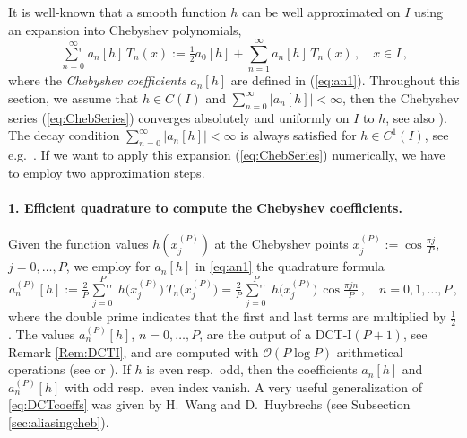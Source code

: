 \documentclass[11pt,a4paper]{scrartcl}
\newcommand{\sumprime}{\mathop{{\sum}'}\limits}
\newcommand{\sumdprime}{\mathop{{\sum}''}\limits}
\numberwithin{equation}{section}
\numberwithin{table}{section}
\numberwithin{figure}{section}
\begin{document}
It is well-known that a smooth function $h$ can be well approximated on $I$ using an expansion into
Chebyshev polynomials,
\begin{equation}
	\label{eq:ChebSeries} 
\textstyle  \sumprime_{n=0}^{\infty} a_n[h]\,T_n(x) := \tfrac12 a_0[h] + \sum\limits_{n=1}^{\infty} a_n[h]\,T_n(x)\,,\quad x \in I\,,
\end{equation}
where the \emph{Chebyshev coefficients} $a_n[h]$ are defined in (\ref{eq:an1}).
Throughout this section,
we assume that $h \in C(I)$ and $\sum_{n=0}^{\infty} |a_n[h]| < \infty$, then the Chebyshev series (\ref{eq:ChebSeries})
converges absolutely and uniformly on $I$ to $h$,
see also \cite[Chapter~6]{PlPoStTa23}).
The decay condition  $\sum_{n=0}^{\infty} |a_n[h]| < \infty$ is always satisfied for $h \in C^1(I)$, see e.g.\ \cite[Theorem~6.11]{PlPoStTa23}.
If we want to apply this expansion (\ref{eq:ChebSeries}) numerically, we have to employ two approximation steps.

\paragraph{1. Efficient quadrature to compute the Chebyshev coefficients.}
Given the function values $h(x_j^{(P)})$ at the Chebyshev points
$x_j^{(P)} := \cos\tfrac{\pi j}{P}$, $j = 0,\ldots,P$, we employ for $a_n[h]$ in \eqref{eq:an1}
the quadrature formula
\begin{equation}
	\label{eq:DCTcoeffs}
	\textstyle a_n^{(P)}[h] := \tfrac{2}{P} \sumdprime_{\!\!\!j=0}^{\!\!\!P}
	\, h\big(x_j^{(P)}\big)\,T_n\big(x_j^{(P)}\big) = \tfrac{2}{P} \sumdprime_{\!\!\!j=0}^{\!\!\!P}
	\, h\big(x_j^{(P)}\big)\,\cos \tfrac{\pi j n}{P}\,,\quad n=0,1,\ldots,P\,,
\end{equation}
where the double prime indicates that the first and last terms are multiplied by $\tfrac12$. The
values $a_n^{(P)}[h]$, $n=0,\ldots,P$, are the output of a DCT-I$(P+1)$, see Remark
\ref{Rem:DCTI}, and are computed with ${\mathcal O}(P\log P)$ arithmetical operations (see
\cite{PlTa05} or \cite[Section~6.3]{PlPoStTa23}). If $h$ is even resp.\ odd, then the
coefficients  $a_n[h]$ and $a_n^{(P)}[h]$ with odd resp.\ even index  vanish.
A very useful generalization of \eqref{eq:DCTcoeffs} was given by H.~Wang and D.~Huybrechs \cite{Wang17} (see Subsection \ref{sec:aliasingcheb}).
\end{document}
